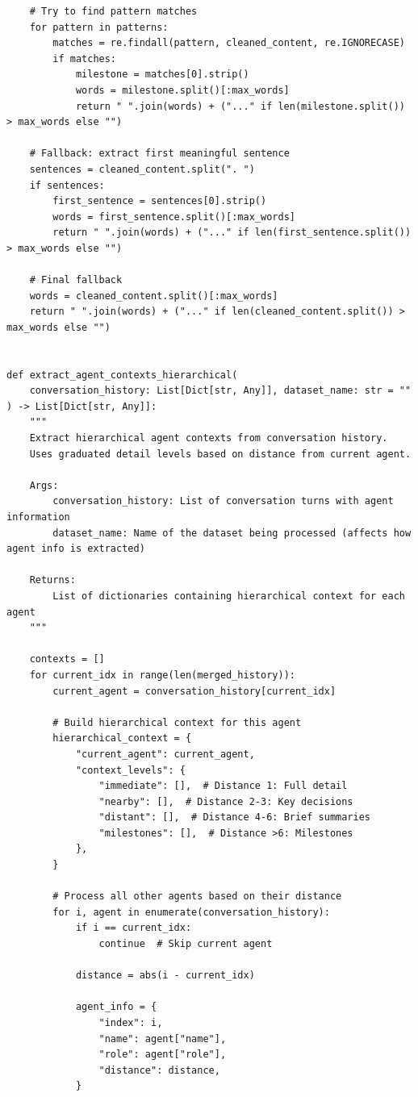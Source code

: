\documentclass{article}
\begin{document}
\begin{lstlisting}
    # Try to find pattern matches
    for pattern in patterns:
        matches = re.findall(pattern, cleaned_content, re.IGNORECASE)
        if matches:
            milestone = matches[0].strip()
            words = milestone.split()[:max_words]
            return " ".join(words) + ("..." if len(milestone.split()) > max_words else "")

    # Fallback: extract first meaningful sentence
    sentences = cleaned_content.split(". ")
    if sentences:
        first_sentence = sentences[0].strip()
        words = first_sentence.split()[:max_words]
        return " ".join(words) + ("..." if len(first_sentence.split()) > max_words else "")

    # Final fallback
    words = cleaned_content.split()[:max_words]
    return " ".join(words) + ("..." if len(cleaned_content.split()) > max_words else "")


def extract_agent_contexts_hierarchical(
    conversation_history: List[Dict[str, Any]], dataset_name: str = ""
) -> List[Dict[str, Any]]:
    """
    Extract hierarchical agent contexts from conversation history.
    Uses graduated detail levels based on distance from current agent.

    Args:
        conversation_history: List of conversation turns with agent information
        dataset_name: Name of the dataset being processed (affects how agent info is extracted)

    Returns:
        List of dictionaries containing hierarchical context for each agent
    """

    contexts = []
    for current_idx in range(len(merged_history)):
        current_agent = conversation_history[current_idx]

        # Build hierarchical context for this agent
        hierarchical_context = {
            "current_agent": current_agent,
            "context_levels": {
                "immediate": [],  # Distance 1: Full detail
                "nearby": [],  # Distance 2-3: Key decisions
                "distant": [],  # Distance 4-6: Brief summaries
                "milestones": [],  # Distance >6: Milestones
            },
        }

        # Process all other agents based on their distance
        for i, agent in enumerate(conversation_history):
            if i == current_idx:
                continue  # Skip current agent

            distance = abs(i - current_idx)

            agent_info = {
                "index": i,
                "name": agent["name"],
                "role": agent["role"],
                "distance": distance,
            }


\end{lstlisting}
\end{document}
